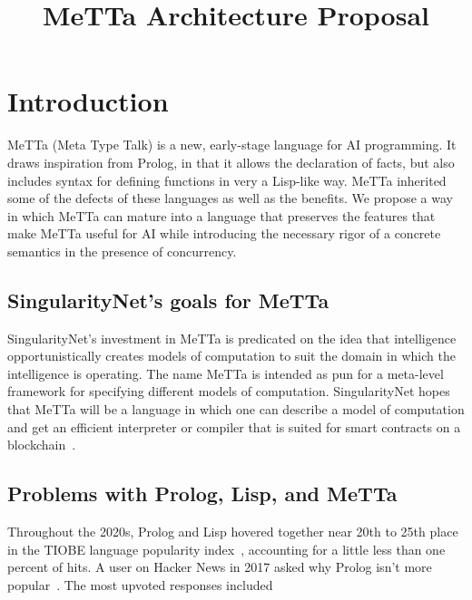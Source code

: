 \documentclass{article}
\title{MeTTa Architecture Proposal}
\author{}
\date{}
\begin{document}
\maketitle

\section{Introduction}

MeTTa (Meta Type Talk) is a new, early-stage language for AI programming.  It draws inspiration from Prolog, in that it allows the declaration of facts, but also includes syntax for defining functions in very a Lisp-like way.  MeTTa inherited some of the defects of these languages as well as the benefits.  We propose a way in which MeTTa can mature into a language that preserves the features that make MeTTa useful for AI while introducing the necessary rigor of a concrete semantics in the presence of concurrency.

\subsection{SingularityNet's goals for MeTTa}

SingularityNet's investment in MeTTa is predicated on the idea that intelligence opportunistically creates models of computation to suit the domain in which the intelligence is operating.  The name MeTTa is intended as pun for a meta-level framework for specifying different models of computation.  SingularityNet hopes that MeTTa will be a language in which one can describe a model of computation and get an efficient interpreter or compiler that is suited for smart contracts on a blockchain~\cite{GoertzelMeredith2024}.

\subsection{Problems with Prolog, Lisp, and MeTTa}

Throughout the 2020s, Prolog and Lisp hovered together near 20th to 25th place in the TIOBE language popularity index~\cite{tiobeIndex}, accounting for a little less than one percent of hits.  A user on Hacker News in 2017 asked why Prolog isn't more popular~\cite{HackerNews}.  The most upvoted responses included
\end{document}
